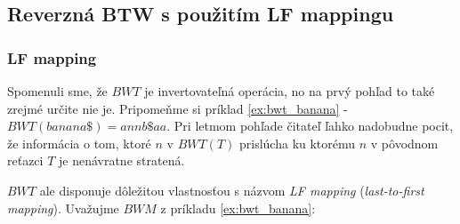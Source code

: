     
    
     
    \subsection{Reverzná BTW s použitím LF mappingu}
    \subsubsection{LF mapping}
    Spomenuli sme, že $BWT$ je invertovateľná operácia, no na prvý pohľad to také zrejmé určite nie je. Pripomeňme si príklad \ref{ex:bwt_banana} - $BWT(banana\$) = annb\$aa$. Pri letmom pohľade čitateľ ľahko nadobudne pocit, že informácia o tom, ktoré $n$ v $BWT(T)$ prislúcha ku ktorému $n$ v pôvodnom reťazci $T$ je nenávratne stratená.
    
    $BWT$ ale disponuje dôležitou vlastnosťou s názvom \emph{LF mapping} (\emph{last-to-first mapping}). Uvažujme $BWM$ z príkladu \ref{ex:bwt_banana}:
    
